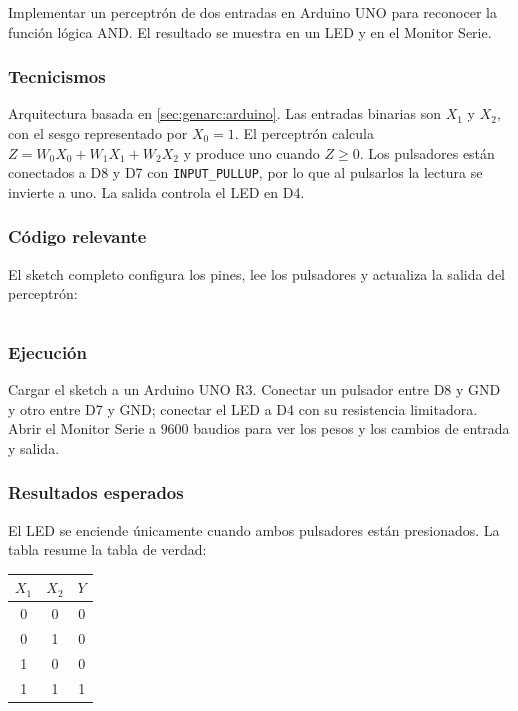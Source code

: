 \documentclass{article}[12pt,a4paper]
\begin{document}
Implementar un perceptrón de dos entradas en Arduino UNO para reconocer la
función lógica AND. El resultado se muestra en un LED y en el Monitor Serie.

\subsubsection{Tecnicismos}

Arquitectura basada en \ref{sec:genarc:arduino}. Las entradas binarias son
\(X_1\) y \(X_2\), con el sesgo representado por \(X_0=1\). El perceptrón
calcula \(Z=W_0X_0+W_1X_1+W_2X_2\) y produce uno cuando \(Z\geq 0\). Los
pulsadores están conectados a D8 y D7 con \texttt{INPUT\_PULLUP}, por lo que
al pulsarlos la lectura se invierte a uno. La salida controla el LED en D4.

\subsubsection{Código relevante}

El sketch completo configura los pines, lee los pulsadores y actualiza la salida
del perceptrón:

\inputminted{cpp}{../clase011/logicgates.ino}

\subsubsection{Ejecución}

Cargar el sketch a un Arduino UNO R3. Conectar un pulsador entre D8 y GND y otro
entre D7 y GND; conectar el LED a D4 con su resistencia limitadora. Abrir el
Monitor Serie a \(9600\) baudios para ver los pesos y los cambios de entrada y
salida.

\subsubsection{Resultados esperados}

El LED se enciende únicamente cuando ambos pulsadores están presionados. La
tabla resume la tabla de verdad:

\begin{center}
\begin{tabular}{cc|c}
  \(X_1\) & \(X_2\) & \(Y\) \\
  \hline
  0 & 0 & 0 \\
  0 & 1 & 0 \\
  1 & 0 & 0 \\
  1 & 1 & 1 \\
\end{tabular}
\end{center}
\end{document}
